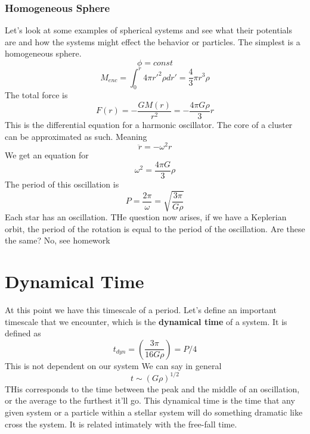 \documentclass[12pt]{article} %
\begin{document}
\subsubsection{Homogeneous Sphere}
Let's look at some examples of spherical systems and see what their
potentials are and how the systems might effect the behavior or
particles. The simplest is a homogeneous sphere. 
\begin{equation}
\phi = const
\end{equation}
\begin{equation}
M_{enc} = \int_0^r 4\pi r'^2 \rho dr' = \frac{4}{3} \pi r^3 \rho
\end{equation}
The total force is 
\begin{equation}
F(r) = - \frac{GM(r)}{r^2} = - \frac{4\pi G\rho}{3} r
\end{equation}
This is the differential equation for a harmonic oscillator. The core
of a cluster can be approximated as such. Meaning
\begin{equation}
\ddot{r} = -\omega^2r
\end{equation}
We get an equation for
\begin{equation}
\omega^2 = \frac{4\pi G}{3} \rho
\end{equation}
The period of this oscillation is
\begin{equation}
P = \frac{2\pi}{\omega}  = \sqrt{\frac{3\pi}{G\rho}}
\end{equation}
Each star has an oscillation. THe question now arises, if we have a
Keplerian orbit, the period of the rotation is equal to the period of
the oscillation. Are these the same? No, see homework

\section{Dynamical Time}
At this point we have this timescale of a period. Let's define an
important timescale that we encounter, which is the \textbf{dynamical time} of
a system. It is defined as 
\begin{equation}
t_{dyn} = (\frac{3\pi}{16 G\rho}) = P/4
\end{equation}
This is not dependent on our system
We can say in general
\begin{equation}
t \sim (G\rho)^{1/2} 
\end{equation}
THis corresponds to the time between the peak and the middle of an
oscillation, or the average to the furthest it'll go. This dynamical
time is the time that any given system or a particle within a stellar
system will do something dramatic like cross the system. It is related
intimately with the free-fall time. 
\end{document}

